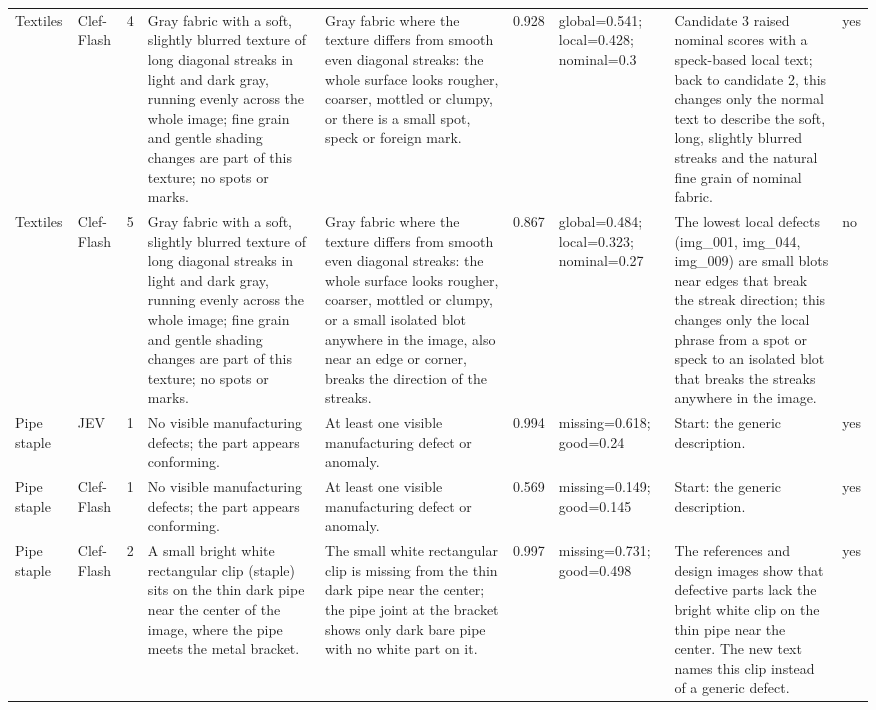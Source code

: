 \begin{table}
\begin{tabular}[t]{llrllrlll}
Textiles & Clef-Flash & 4 & Gray fabric with a soft, slightly blurred texture of long diagonal streaks in light and dark gray, running evenly across the whole image; fine grain and gentle shading changes are part of this texture; no spots or marks. & Gray fabric where the texture differs from smooth even diagonal streaks: the whole surface looks rougher, coarser, mottled or clumpy, or there is a small spot, speck or foreign mark. & 0.928 & global=0.541; local=0.428; nominal=0.3 & Candidate 3 raised nominal scores with a speck-based local text; back to candidate 2, this changes only the normal text to describe the soft, long, slightly blurred streaks and the natural fine grain of nominal fabric. & yes\\
Textiles & Clef-Flash & 5 & Gray fabric with a soft, slightly blurred texture of long diagonal streaks in light and dark gray, running evenly across the whole image; fine grain and gentle shading changes are part of this texture; no spots or marks. & Gray fabric where the texture differs from smooth even diagonal streaks: the whole surface looks rougher, coarser, mottled or clumpy, or a small isolated blot anywhere in the image, also near an edge or corner, breaks the direction of the streaks. & 0.867 & global=0.484; local=0.323; nominal=0.27 & The lowest local defects (img\_001, img\_044, img\_009) are small blots near edges that break the streak direction; this changes only the local phrase from a spot or speck to an isolated blot that breaks the streaks anywhere in the image. & no\\
Pipe staple & JEV & 1 & No visible manufacturing defects; the part appears conforming. & At least one visible manufacturing defect or anomaly. & 0.994 & missing=0.618; good=0.24 & Start: the generic description. & yes\\
\addlinespace
Pipe staple & Clef-Flash & 1 & No visible manufacturing defects; the part appears conforming. & At least one visible manufacturing defect or anomaly. & 0.569 & missing=0.149; good=0.145 & Start: the generic description. & yes\\
Pipe staple & Clef-Flash & 2 & A small bright white rectangular clip (staple) sits on the thin dark pipe near the center of the image, where the pipe meets the metal bracket. & The small white rectangular clip is missing from the thin dark pipe near the center; the pipe joint at the bracket shows only dark bare pipe with no white part on it. & 0.997 & missing=0.731; good=0.498 & The references and design images show that defective parts lack the bright white clip on the thin pipe near the center. The new text names this clip instead of a generic defect. & yes\\

\end{tabular}
\end{table}
